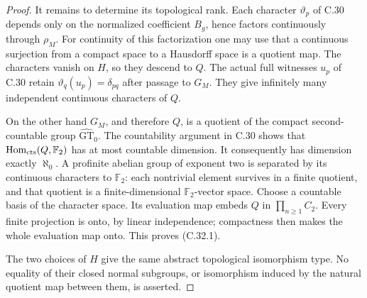\begin{proof}
It remains to determine its topological rank. Each character
$\vartheta_p$ of C.30 depends only on the normalized coefficient
$B_g$, hence factors continuously through $\rho_M$.
For continuity of this factorization one may use that a
continuous surjection from a compact space to a Hausdorff space
is a quotient map. The characters vanish on $H$, so they descend
to $Q$. The actual full witnesses $u_p$ of C.30 retain
$\vartheta_q(u_p)=\delta_{pq}$ after passage to $G_M$.
They give infinitely many independent continuous characters
of $Q$.

On the other hand $G_M$, and therefore $Q$, is a quotient of
the compact second-countable group
$\widehat{\mathrm{GT}}_0$. The countability argument in C.30
shows that $\operatorname{Hom}_{\mathrm{cts}}(Q,\mathbb F_2)$ has at most
countable dimension. It consequently has dimension exactly
$\aleph_0$. A profinite abelian group of exponent two is
separated by its continuous characters to $\mathbb F_2$:
each nontrivial element survives in a finite quotient, and
that quotient is a finite-dimensional $\mathbb F_2$-vector
space. Choose a countable basis of the character space.
Its evaluation map embeds $Q$ in $\prod_{n\geq1}C_2$.
Every finite projection is onto, by linear independence;
compactness then makes the whole evaluation map onto.
This proves (C.32.1).

The two choices of $H$ give the same abstract topological
isomorphism type. No equality of their closed normal subgroups,
or isomorphism induced by the natural quotient map between
them, is asserted.
\end{proof}


